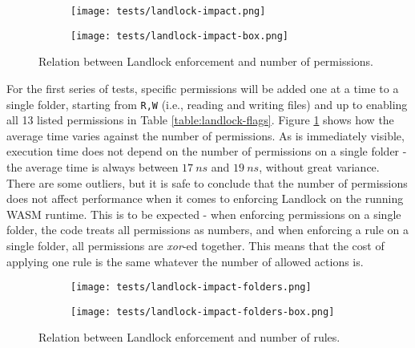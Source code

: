 \begin{figure}[hbt!]
  \centering
  \begin{subfigure}[b]{0.8\textwidth}
    \centering
    \texttt{[image: tests/landlock-impact.png]}
  \end{subfigure}

  \begin{subfigure}[b]{0.8\textwidth}
    \centering
    \texttt{[image: tests/landlock-impact-box.png]}
  \end{subfigure}

  \caption{Relation between Landlock enforcement and number of permissions.}
  \label{fig:perf-test-landlock-impact-permissions}
\end{figure}

For the first series of tests, specific permissions will be added one at a time to a single folder,
starting from \texttt{R,W} (i.e., reading and writing files) and up to enabling all 13 listed permissions
in Table \ref{table:landlock-flags}.
Figure \ref{fig:perf-test-landlock-impact-permissions} shows how the average time varies against the number of permissions.
As is immediately visible, execution time does not depend on the number of permissions on a single folder -
the average time is always between $17\ ns$ and $19\ ns$, without great variance.
There are some outliers, but it is safe to conclude that the number of permissions does not affect performance
when it comes to enforcing Landlock on the running WASM runtime.
This is to be expected - when enforcing permissions on a single folder, the code treats all permissions as numbers,
and when enforcing a rule on a single folder, all permissions are \textit{xor}-ed together.
This means that the cost of applying one rule is the same whatever the number of allowed actions is.

\begin{figure}[hbt!]
  \centering
  \begin{subfigure}[b]{0.8\textwidth}
    \centering
    \texttt{[image: tests/landlock-impact-folders.png]}
  \end{subfigure}

  \begin{subfigure}[b]{0.8\textwidth}
    \centering
    \texttt{[image: tests/landlock-impact-folders-box.png]}
  \end{subfigure}

  \caption{Relation between Landlock enforcement and number of rules.}
  \label{fig:perf-test-landlock-impact-folders}
\end{figure}

